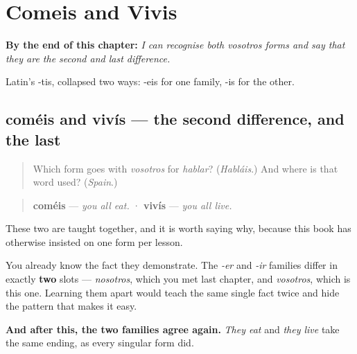 
\chapter{Comeis and Vivis}
\label{ch:spanish-er-ir-2pl}

\begin{chapteropening}
\textbf{By the end of this chapter:} \emph{I can recognise both vosotros forms and say that they are the second and last difference.}

Latin's -tis, collapsed two ways: -eis for one family, -is for the other.
\end{chapteropening}

\section[coméis · vivís]{coméis and vivís — the second difference, and the last}

\label{lesson:ES-C07-comeis-vivis}



\begin{quote}
Which form goes with \emph{vosotros} for \emph{hablar}? (\emph{Habláis}.) And where is that word used? (\emph{Spain}.)
\end{quote}

\begin{grammarlens}[title={Grammar Lens: two families, two endings, one lesson}]
\begin{quote}
\textbf{coméis} — \emph{you all eat.}  ·  \textbf{vivís} — \emph{you all live.}
\end{quote}

These two are taught together, and it is worth saying why, because this book has otherwise insisted on one form per lesson.

You already know the fact they demonstrate. The \emph{-er} and \emph{-ir} families differ in exactly \textbf{two} slots — \emph{nosotros}, which you met last chapter, and \emph{vosotros}, which is this one. Learning them apart would teach the same single fact twice and hide the pattern that makes it easy.

\textbf{And after this, the two families agree again.} \emph{They eat} and \emph{they live} take the same ending, as every singular form did.
\end{grammarlens}

